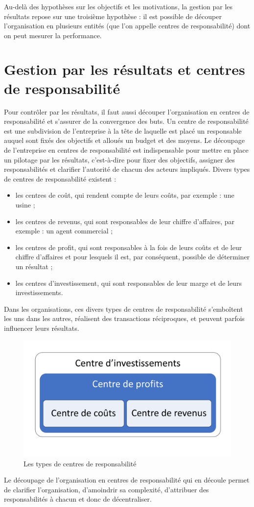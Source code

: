 \documentclass[oneside]{kaobook}
\begin{document}
Au-delà des hypothèses sur les objectifs et les motivations, la gestion par les résultats repose sur une troisième hypothèse : il est possible de découper l'organisation en plusieurs entités (que l'on appelle centres de responsabilité) dont on peut mesurer la performance.

\section{Gestion par les résultats et centres de responsabilité}
\label{sec:orgb618994}
Pour contrôler par les résultats, il faut aussi découper l’organisation en centres de responsabilité et s’assurer de la convergence des buts. 
Un centre de responsabilité est une subdivision de l’entreprise à la tête de laquelle est placé un responsable auquel sont fixés des objectifs et alloués un budget et des moyens. Le découpage de l’entreprise en centres de responsabilité est indispensable pour mettre en place un pilotage par les résultats, c’est-à-dire pour fixer des objectifs, assigner des responsabilités et clarifier l’autorité de chacun des acteurs impliqués. Divers types de centres de responsabilité existent : 
\begin{itemize}
\item les centres de coût, qui rendent compte de leurs coûts, par exemple : une usine ;
\item les centres de revenus, qui sont responsables de leur chiffre d’affaires, par exemple : un agent commercial ;
\item les centres de profit, qui sont responsables à la fois de leurs coûts et de leur chiffre d’affaires et pour lesquels il est, par conséquent, possible de déterminer un résultat ;
\item les centres d’investissement, qui sont responsables de leur marge et de leurs investissements.
\end{itemize}
Dans les organisations, ces divers types de centres de responsabilité s’emboîtent les uns dans les autres, réalisent des transactions réciproques, et peuvent parfois influencer leurs résultats.

\begin{figure}[H]

\includegraphics{./img/centres.pdf}
\caption{Les types de centres de responsabilité}
\end{figure}
Le découpage de l’organisation en centres de responsabilité qui en découle permet de clarifier l’organisation, d’amoindrir sa complexité, d’attribuer des responsabilités à chacun et donc de décentraliser.
\end{document}
